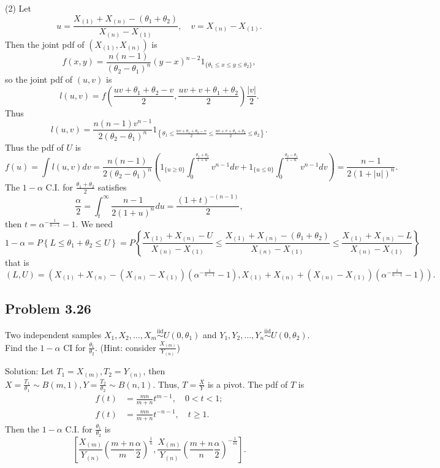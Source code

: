 (2) Let
\[
u=\frac{X_{(1)}+X_{(n)}-\left(\theta_{1}+\theta_{2}\right)}{X_{(n)}-X_{(1)}},\quad v=X_{(n)}-X_{(1)}.
\]
Then the joint pdf of $\left(X_{(1)},X_{(n)}\right)$ is
\[
f(x,y)=\frac{n(n-1)}{(\theta_{2}-\theta_{1})^{n}}(y-x)^{n-2}1_{\{\theta_{1}\leq x\leq y\leq\theta_{2}\}},
\]
so the joint pdf of $(u,v)$ is
\[
l(u,v)=f\left(\frac{uv+\theta_{1}+\theta_{2}-v}{2},\frac{uv+v+\theta_{1}+\theta_{2}}{2}\right)\frac{|v|}{2}.
\]
Thus
\[
l(u,v)=\frac{n(n-1)v^{n-1}}{2(\theta_{2}-\theta_{1})^{n}}1_{\left\{\theta_{1}\leq\frac{uv+\theta_{1}+\theta_{2}-v}{2}\leq\frac{uv+v+\theta_{1}+\theta_{2}}{2}\leq\theta_{2}\right\}}.
\]
Thus the pdf of $U$ is
\[
f(u)=\int l(u,v)dv=\frac{n(n-1)}{2(\theta_{2}-\theta_{1})^{n}}\left(1_{\{u\geq 0\}}\int_{0}^{\frac{\theta_{1}+\theta_{2}}{1+u}}v^{n-1}dv+1_{\{u\leq 0\}}\int_{0}^{\frac{\theta_{2}-\theta_{1}}{1-u}}v^{n-1}dv\right)=\frac{n-1}{2(1+|u|)^{n}}.
\]
The $1-\alpha$ C.I. for $\frac{\theta_{1}+\theta_{2}}{2}$ satisfies
\[
\frac{\alpha}{2}=\int_{t}^{\infty}\frac{n-1}{2(1+u)^{n}}du=\frac{(1+t)^{-(n-1)}}{2},
\]
then $t=\alpha^{-\frac{1}{n-1}}-1$. We need
\[
1-\alpha=P\left\{L\leq\theta_{1}+\theta_{2}\leq U\right\}=P\left\{\frac{X_{(1)}+X_{(n)}-U}{X_{(n)}-X_{(1)}}\leq\frac{X_{(1)}+X_{(n)}-(\theta_{1}+\theta_{2})}{X_{(n)}-X_{(1)}}\leq\frac{X_{(1)}+X_{(n)}-L}{X_{(n)}-X_{(1)}}\right\}
\]
that is
\[
(L,U)=\left(X_{(1)}+X_{(n)}-\left(X_{(n)}-X_{(1)}\right)\left(\alpha^{-\frac{1}{n-1}}-1\right),X_{(1)}+X_{(n)}+\left(X_{(n)}-X_{(1)}\right)\left(\alpha^{-\frac{1}{n-1}}-1\right)\right).
\]

\subsection*{Problem 3.26}
Two independent samples $X_{1},X_{2},\ldots,X_{m}\overset{\text{iid}}{\sim}U\left(0,\theta_{1}\right)$ and $Y_{1},Y_{2},\ldots,Y_{n}\overset{\text{iid}}{\sim}U\left(0,\theta_{2}\right)$. Find the $1-\alpha$ CI for $\frac{\theta_{1}}{\theta_{2}}$. (Hint: consider $\frac{X_{(m)}}{Y_{(n)}}$)

{Solution:}
Let $T_{1}=X_{(m)},T_{2}=Y_{(n)}$, then $X=\frac{T_{1}}{\theta_{1}}\sim B(m,1),Y=\frac{T_{2}}{\theta_{2}}\sim B(n,1)$. Thus, $T=\frac{X}{Y}$ is a pivot. The pdf of $T$ is
\[
\begin{aligned}
f(t)&=\frac{mn}{m+n}t^{m-1},\quad 0<t<1; \\
f(t)&=\frac{mn}{m+n}t^{-n-1},\quad t\geq 1.
\end{aligned}
\]
Then the $1-\alpha$ C.I. for $\frac{\theta_{1}}{\theta_{2}}$ is
\[
\left[\frac{X_{(m)}}{Y_{(n)}}\left(\frac{m+n}{m}\frac{\alpha}{2}\right)^{\frac{1}{n}},\frac{X_{(m)}}{Y_{(n)}}\left(\frac{m+n}{n}\frac{\alpha}{2}\right)^{-\frac{1}{m}}\right].
\]

